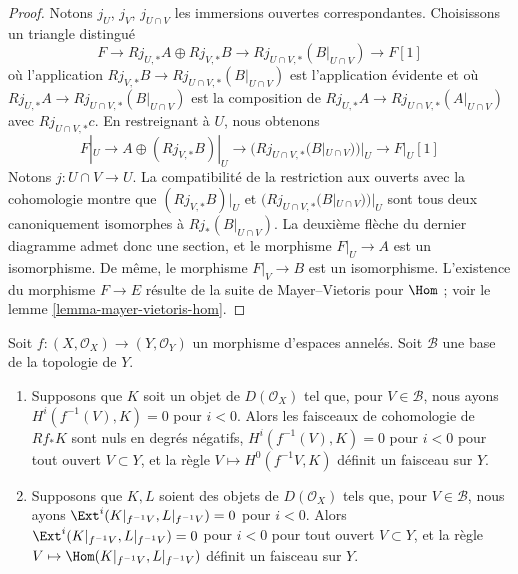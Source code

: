 {\begin{proof}
Notons $j_U$, $j_V$, $j_{U \cap V}$ les immersions ouvertes correspondantes. Choisissons un triangle distingué
$$
F \to Rj_{U, *}A \oplus Rj_{V, *}B \to Rj_{U \cap V, *}(B|_{U \cap V})
\to F[1]
$$
où l'application $Rj_{V, *}B \to Rj_{U \cap V, *}(B|_{U \cap V})$ est l'application évidente et où
$Rj_{U, *}A \to Rj_{U \cap V, *}(B|_{U \cap V})$
est la composition de
$Rj_{U, *}A \to Rj_{U \cap V, *}(A|_{U \cap V})$
avec $Rj_{U \cap V, *}c$. En restreignant à $U$, nous obtenons
$$
F|_U \to A \oplus (Rj_{V, *}B)|_U \to (Rj_{U \cap V, *}(B|_{U \cap V}))|_U
\to F|_U[1]
$$
Notons $j : U \cap V \to U$. La compatibilité de la restriction aux ouverts avec la cohomologie montre que
$(Rj_{V, *}B)|_U$ et $(Rj_{U \cap V, *}(B|_{U \cap V}))|_U$
sont tous deux canoniquement isomorphes à $Rj_*(B|_{U \cap V})$. La deuxième flèche du dernier diagramme admet donc une section, et le morphisme $F|_U \to A$ est un isomorphisme. De même, le morphisme $F|_V \to B$ est un isomorphisme. L'existence du morphisme $F \to E$ résulte de la suite de Mayer--Vietoris pour $\Hom$ ; voir le lemme \ref{lemma-mayer-vietoris-hom}.

\end{proof}

\begin{lemma}

\label{lemma-vanishing-and-glueing}

Soit $f : (X, \mathcal{O}_X) \to (Y, \mathcal{O}_Y)$ un morphisme d'espaces annelés. Soit $\mathcal{B}$ une base de la topologie de $Y$.

\begin{enumerate}

\item Supposons que $K$ soit un objet de $D(\mathcal{O}_X)$ tel que, pour $V \in \mathcal{B}$, nous ayons $H^i(f^{-1}(V), K) = 0$ pour $i < 0$. Alors les faisceaux de cohomologie de $Rf_*K$ sont nuls en degrés négatifs,
$H^i(f^{-1}(V), K) = 0$ pour $i < 0$ pour tout ouvert $V \subset Y$, et la règle $V \mapsto H^0(f^{-1}V, K)$ définit un faisceau sur $Y$.
\item Supposons que $K, L$ soient des objets de $D(\mathcal{O}_X)$ tels que, pour $V \in \mathcal{B}$, nous ayons
$\Ext^i(K|_{f^{-1}V}, L|_{f^{-1}V}) = 0$ pour $i < 0$. Alors $\Ext^i(K|_{f^{-1}V}, L|_{f^{-1}V}) = 0$ pour $i < 0$
pour tout ouvert $V \subset Y$, et la règle $V \mapsto \Hom(K|_{f^{-1}V}, L|_{f^{-1}V})$ définit un faisceau sur $Y$.

\end{enumerate}


\end{lemma}}
